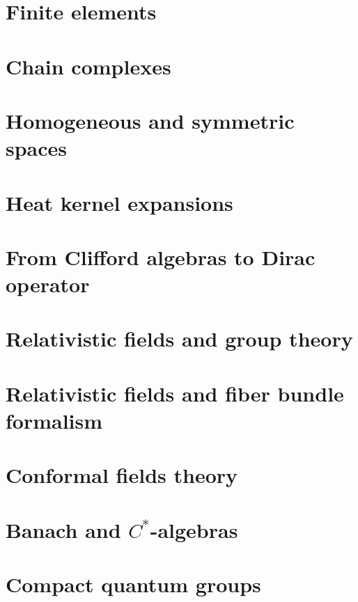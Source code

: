 \documentclass[french,a4paper]{book}
\begin{document}
\chapter{Finite elements}


\chapter{Chain complexes}


\chapter{Homogeneous and symmetric spaces}




\chapter{Heat kernel expansions}


\chapter{From Clifford algebras to Dirac operator}



\chapter{Relativistic fields and group theory}


\chapter{Relativistic fields and fiber bundle formalism}


\chapter{Conformal fields theory}


\chapter{Banach and \texorpdfstring{$C^*$}{C*}-algebras}




\chapter{Compact quantum groups}

\end{document}
